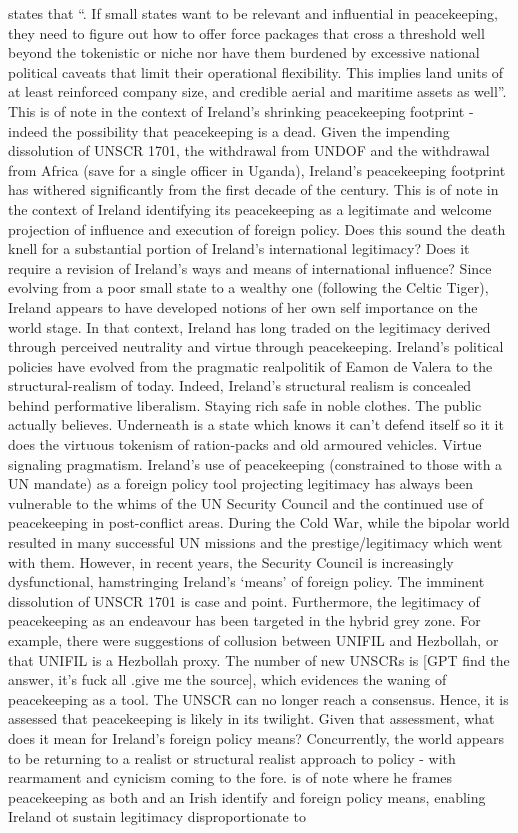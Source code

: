 \parencite{FLYNN_2019} states that ``. If small states want to be relevant and influential in peacekeeping, they need to figure out how to offer force packages that cross a threshold well beyond the tokenistic or niche nor have them burdened by excessive national political caveats that limit their operational flexibility. This implies land units of at  least reinforced company size, and credible aerial and maritime assets as well''. This is of note in the context of Ireland's shrinking peacekeeping footprint - indeed the possibility that peacekeeping is a dead. Given the impending dissolution of UNSCR 1701, the withdrawal from UNDOF and the withdrawal from Africa (save for a single officer in Uganda), Ireland's peacekeeping footprint has withered significantly from the first decade of the century. This is of note in the context of Ireland identifying its peacekeeping as a legitimate and welcome projection of influence and execution of foreign policy. Does this sound the death knell for a substantial portion of Ireland's international legitimacy? Does it require a revision of Ireland's ways and means of international influence? Since evolving from a poor small state to a wealthy one (following the Celtic Tiger), Ireland appears to have developed notions of her own self importance on the world stage. In that context, Ireland has long traded on the legitimacy derived through perceived neutrality and virtue through peacekeeping. Ireland's political policies have evolved from the pragmatic realpolitik of Eamon de Valera to the structural-realism of today. Indeed, Ireland's structural realism is concealed behind performative liberalism. Staying rich safe in noble clothes. The public actually believes. Underneath is a state which knows it can't defend itself so it it does the virtuous tokenism of ration-packs and old armoured vehicles. Virtue signaling pragmatism. Ireland's use of peacekeeping  (constrained to those with a UN mandate) as a foreign policy tool projecting legitimacy has always been vulnerable to the whims of the UN Security Council and the continued use of peacekeeping in post-conflict areas. During the Cold War, while the bipolar world resulted in many successful UN missions and the prestige/legitimacy which went with them. However, in recent years, the Security Council is increasingly dysfunctional, hamstringing Ireland's `means' of foreign policy. The imminent dissolution of UNSCR 1701 is case and point. Furthermore, the legitimacy of peacekeeping as an endeavour has been targeted in the hybrid grey zone. For example, there were suggestions of collusion between UNIFIL and Hezbollah, or that UNIFIL is a Hezbollah proxy. The number of new UNSCRs is [GPT find the answer, it's fuck all .give me the source], which evidences the waning of peacekeeping as a tool. The UNSCR can no longer reach a consensus. Hence, it is assessed that peacekeeping is likely in its twilight. Given that assessment, what does it mean for Ireland's foreign policy means? Concurrently, the world appears to be returning to a realist or structural realist approach to policy - with rearmament and cynicism coming to the fore. \parencite{QUINN_2018} is of note where he frames peacekeeping as both and an Irish identify and foreign policy means, enabling Ireland ot sustain legitimacy disproportionate to 